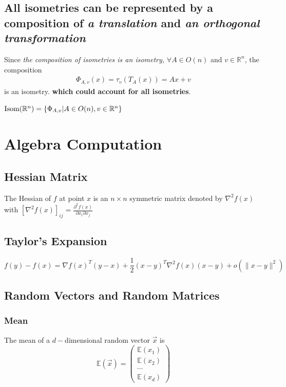 \documentclass[11pt]{elegantbook}
\begin{document}
\section{All isometries can be represented by a composition of \textit{a translation} and \textit{an orthogonal transformation}}
Since \textit{the composition of isometries is an isometry,} $\forall A\in O(n)$ and $v\in \mathbb{R}^n$, the composition
\begin{equation}
    \begin{aligned}
        \Phi_{A,v}(x)=\tau_v(T_A(x))=Ax+v
    \end{aligned}
    \nonumber
\end{equation}
is an isometry. \textbf{which could account for all isometries}.
\begin{theorem}
$\textnormal{Isom}(\mathbb{R}^n)=\{\Phi_{A,v}|A\in O(n), v\in \mathbb{R}^n \}$
\end{theorem}

\chapter{Algebra Computation}
\section{Hessian Matrix}
\begin{definition}
    The Hessian of $f$ at point $x$ is an $n\times n$ symmetric matrix denoted by $\nabla^2 f(x)$ with $[\nabla^2 f(x)]_{ij}=\frac{\partial^2 f(x)}{\partial x_i\partial x_j}$
\end{definition}

\section{Taylor's Expansion}
\begin{definition}
    $$f(y)-f(x)=\nabla f(x)^T(y-x)+\frac{1}{2}(x-y)^T \nabla^2 f(x)(x-y)+o(\|x-y\|^2)$$
\end{definition}
\section{ Random Vectors and Random Matrices}
\subsection{Mean}
\begin{definition}
    The mean of a $d-$dimensional random vector $\vec{x}$ is
    $$\mathbb{E}(\vec{x})=\begin{pmatrix}
        \mathbb{E}(x_1)\\
        \mathbb{E}(x_2)\\
        \cdots\\
        \mathbb{E}(x_d)
    \end{pmatrix}$$
\end{definition}
\end{document}

